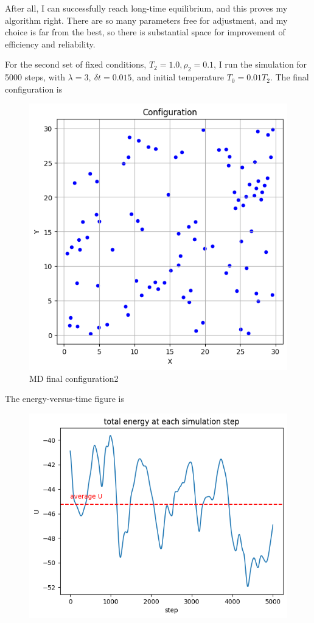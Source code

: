 \documentclass[letterpaper,12pt]{article}
\numberwithin{equation}{section}
\begin{document}
\begin{enumerate}[label=(\alph*)]
    After all, I can successfully reach long-time equilibrium, and this proves my algorithm right. There are so many parameters free for adjustment, and my choice is far from the best, so there is substantial space for improvement of efficiency and reliability.
    \vspace{\baselineskip}
    
    For the second set of fixed conditions, $T_2=1.0,\rho_2=0.1$, I run the simulation for 5000 steps, with $\lambda=3,\ \delta t=0.015$, and initial temperature $T_0=0.01T_2$. The final configuration is 
    \begin{figure}[H]
        \centering
        \includegraphics{Project/final_config_md2.png}
        \caption{MD final configuration2}
        \label{fig:final_config_md2}
    \end{figure}
    The energy-versus-time figure is
    \begin{figure}[H]
        \centering
        \includegraphics{Project/energy_to_time_md4.png}

\end{figure}
\end{enumerate}
\end{document}
